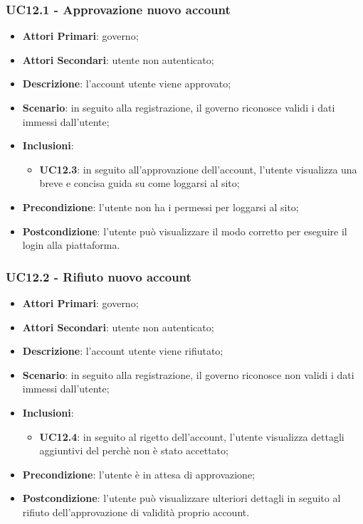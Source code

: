 \subsubsection{UC12.1 - Approvazione nuovo account}
\begin{itemize}
	\item \textbf{Attori Primari}:
	governo;
	\item \textbf{Attori Secondari}:
	utente non autenticato;
	\item \textbf{Descrizione}: l'account utente viene approvato;
	\item \textbf{Scenario}: in seguito alla registrazione, il governo riconosce validi i dati immessi dall'utente;
	\item \textbf{Inclusioni}:
	\begin{itemize}
		\item \textbf{UC12.3}: in seguito all'approvazione dell'account, l'utente visualizza una breve e concisa guida su come loggarsi al sito;
	\end{itemize}
	\item \textbf{Precondizione}: l'utente non ha i permessi per loggarsi al sito;
	\item \textbf{Postcondizione}: l'utente può visualizzare il modo corretto per eseguire il login alla piattaforma.
	
\end{itemize}
\subsubsection{UC12.2 - Rifiuto nuovo account}
\begin{itemize}
	\item \textbf{Attori Primari}:
	governo;
	\item \textbf{Attori Secondari}:
	utente non autenticato;
	\item \textbf{Descrizione}: l'account utente viene rifiutato;
	\item \textbf{Scenario}: in seguito alla registrazione, il governo riconosce non validi i dati immessi dall'utente;
	\item \textbf{Inclusioni}:
	\begin{itemize}
		\item \textbf{UC12.4}: in seguito al rigetto  dell'account, l'utente visualizza dettagli aggiuntivi del perchè non è stato accettato;
	\end{itemize}
	\item \textbf{Precondizione}: l'utente è in attesa di approvazione;
	\item \textbf{Postcondizione}: l'utente può visualizzare ulteriori dettagli in seguito al rifiuto dell'approvazione di validità proprio account.
	
\end{itemize}
